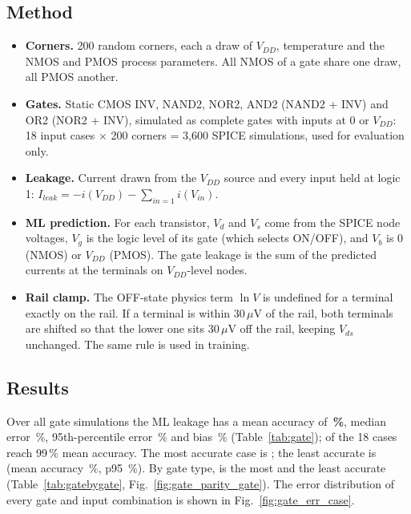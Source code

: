 \documentclass[12pt]{article}
\begin{document}
\subsection{Method}
\begin{itemize}
    \item \textbf{Corners.} 200 random corners, each a draw of $V_{DD}$, temperature and the NMOS
          and PMOS process parameters. All NMOS of a gate share one draw, all PMOS another.
    \item \textbf{Gates.} Static CMOS INV, NAND2, NOR2, AND2 (NAND2 + INV) and OR2 (NOR2 + INV),
          simulated as complete gates with inputs at 0 or $V_{DD}$: 18 input cases $\times$ 200
          corners = 3{,}600 SPICE simulations, used for evaluation only.
    \item \textbf{Leakage.} Current drawn from the $V_{DD}$ source and every input held at logic 1:
          $I_{leak} = -i(V_{DD}) - \sum_{in=1} i(V_{in})$.
    \item \textbf{ML prediction.} For each transistor, $V_d$ and $V_s$ come from the SPICE node
          voltages, $V_g$ is the logic level of its gate (which selects ON/OFF), and $V_b$ is 0
          (NMOS) or $V_{DD}$ (PMOS). The gate leakage is the sum of the predicted currents at the
          terminals on $V_{DD}$-level nodes.
    \item \textbf{Rail clamp.} The OFF-state physics term $\ln V$ is undefined for a terminal exactly
          on the rail. If a terminal is within 30\,$\mu$V of the rail, both terminals are shifted so
          that the lower one sits 30\,$\mu$V off the rail, keeping $V_{ds}$ unchanged. The same rule
          is used in training.
\end{itemize}

\subsection{Results}
Over all gate simulations the ML leakage has a mean accuracy of \textbf{\GateMeanAcc\,\%}, median
error \GateMedErr\,\%, 95th-percentile error \GatePninetyfive\,\% and bias \GateBias\,\%
(Table~\ref{tab:gate}); \GateNinetyNineCount{} of the 18 cases reach 99\,\% mean accuracy. The most
accurate case is \GateBest; the least accurate is \GateWorst{} (mean accuracy \GateWorstAcc\,\%,
p95 \GateWorstPninetyfive\,\%). By gate type, \GateBestGate{} is the most and \GateWorstGate{} the
least accurate (Table~\ref{tab:gatebygate}, Fig.~\ref{fig:gate_parity_gate}). The error
distribution of every gate and input combination is shown in Fig.~\ref{fig:gate_err_case}.
\end{document}
